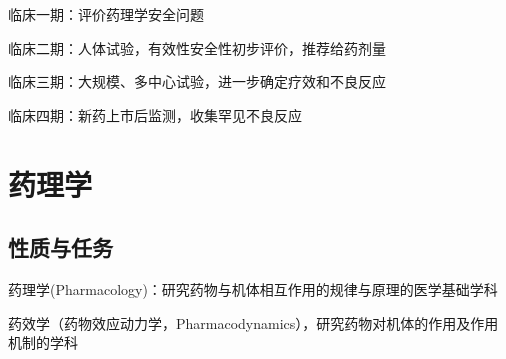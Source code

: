临床一期：评价药理学安全问题

临床二期：人体试验，有效性安全性初步评价，推荐给药剂量

临床三期：大规模、多中心试验，进一步确定疗效和不良反应

临床四期：新药上市后监测，收集罕见不良反应

\section{药理学}%
\label{sec:药理学}
\subsection{性质与任务}%
\label{sub:性质与任务}
\begin{defi}
    药理学(Pharmacology)：研究药物与机体相互作用的规律与原理的医学基础学科
\end{defi}
\begin{defi}
    药效学（药物效应动力学，Pharmacodynamics），研究药物对机体的作用及作用机制的学科
\end{defi}

